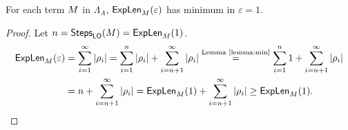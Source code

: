 \begin{corollary}
	For each term $M$ in $\Lambda_{A}$, $\textsf{ExpLen}_{M}(\varepsilon)$ has minimum in $\varepsilon=1$.
\end{corollary}
\begin{proof}
	Let $n=\textsf{Steps}_{\textsf{LO}}(M)=\textsf{ExpLen}_{M}(1)$.
	\begin{align*}
	\textsf{ExpLen}_{M}(\varepsilon)&=\sum\limits_{i=1}^{\infty} |\rho_i|=\sum\limits_{i=1}^{n} |\rho_i|+\sum\limits_{i=n+1}^{\infty} |\rho_i|\overset{\textrm{Lemma \ref{lemma:min}}}{=}\sum\limits_{i=1}^{n}1+\sum\limits_{i=n+1}^{\infty} |\rho_i|\\
	&=n+\sum\limits_{i=n+1}^{\infty}|\rho_i|=\textsf{ExpLen}_{M}(1)+\sum\limits_{i=n+1}^{\infty}|\rho_i|\geq \textsf{ExpLen}_{M}(1).
	\end{align*}
\end{proof}
